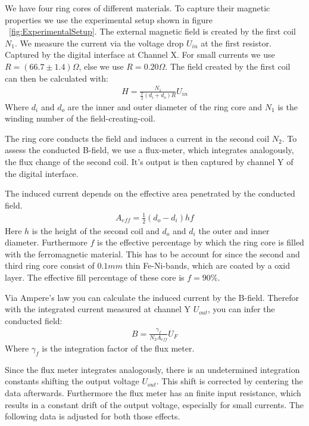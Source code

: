 \documentclass[a4paper,10pt,twocolumn]{article}
\begin{document}
    We have four ring cores of different materials.
    To capture their magnetic properties we use the experimental setup shown in figure ~\ref{fig:ExperimentalSetup}. 
    The external magnetic field is created by the first coil $N_1$.
    We measure the current via the voltage drop $U_{in}$ at the first resistor.
    Captured by the digital interface at Channel X.
    For small currents we use $R = (66.7 \pm 1.4) \Omega$, else we use $R = 0.20 \Omega$.
    The field created by the first coil can then be calculated with:
    \begin{align}
        \label{eq:CalculateHField}
        H = \frac{N_1}{\frac{\pi}{2}(d_i + d_o)R}U_{in}
    \end{align}
    Where $d_i$ and $d_o$ are the inner and outer diameter of the ring core and $N_1$ is the winding number of the
    field-creating-coil.
    
    The ring core conducts the field and induces a current in the second coil $N_2$.
    To assess the conducted B-field, we use a flux-meter, which integrates analogously, the flux change of the second coil.
    It's output is then captured by channel Y of the digital interface.
    
    The induced current depends on the effective area penetrated by the conducted field.
    \begin{align}
        \label{eq:EffectiveAreaOfInductionCoil}
        A_{eff} = \frac{1}{2} (d_o - d_i) h f
    \end{align}
    Here $h$ is the height of the second coil and $d_o$ and $d_i$ the outer and inner diameter.
    Furthermore $f$ is the effective percentage by which the ring core is filled with the ferromagnetic material.
    This has to be account for since the second and third ring core consist of $0.1 mm$ thin Fe-Ni-bands, which are coated by a oxid layer.
    The effective fill percentage of these core is $f = 90\%$.
    
    Via Ampere's law you can calculate the induced current by the B-field.
    Therefor with the integrated current measured at channel Y $U_{out}$, you can infer the conducted field:
    \begin{align}
        \label{eq:CalculateBField} 
        B = \frac{\gamma_f}{N_2 A_{eff}} U_{F}
    \end{align}
    Where $\gamma_f$ is the integration factor of the flux meter.
    
    Since the flux meter integrates analogously, there is an undetermined integration constants shifting the output
    voltage $U_{out}$.
    This shift is corrected by centering the data afterwards.
    Furthermore the flux meter has an finite input resistance, which results in a constant drift of the output voltage,
    especially for small currents.
    The following data is adjusted for both those effects.
    
\end{document}

